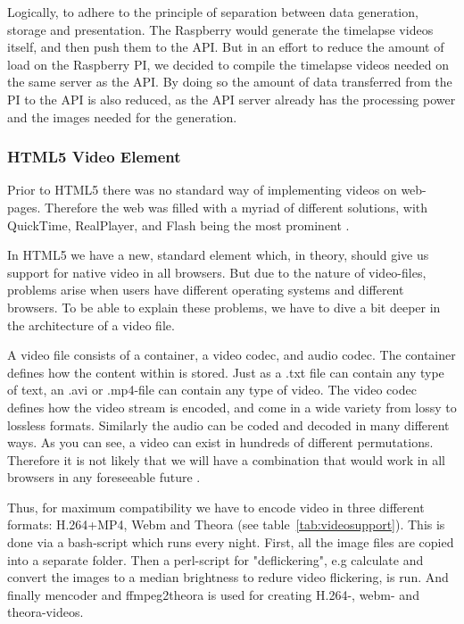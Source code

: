 Logically, to adhere to the principle of separation between data generation, storage and presentation. The Raspberry would generate the timelapse videos itself, and then push them to the API. But in an effort to reduce the amount of load on the Raspberry PI, we decided to compile the timelapse videos needed on the same server as the API. By doing so the amount of data transferred from the PI to the API is also reduced, as the API server already has the processing power and the images needed for the generation. 

\subsubsection{HTML5 Video Element}
Prior to HTML5 there was no standard way of implementing videos on web-pages. Therefore the web was filled with a myriad of different solutions, with QuickTime, RealPlayer, and Flash being the most prominent \citep{pilgrim2010html5}.

In HTML5 we have a new, standard \verb@video@ element which, in theory, should give us support for native video in all browsers. But due to the nature of video-files, problems arise when users have different operating systems and different browsers. To be able to explain these problems, we have to dive a bit deeper in the architecture of a video file.

A video file consists of a container, a video codec, and audio codec. The container defines how the content within is stored. Just as a .txt file can contain any type of text, an .avi or .mp4-file can contain any type of video. The video codec defines how the video stream is encoded, and come in a wide variety from lossy to lossless formats. Similarly the audio can be coded and decoded in many different ways. As you can see, a video can exist in hundreds of different permutations. Therefore it is not likely that we will have a combination that would work in all browsers in any foreseeable future \citep{pilgrim2010html5}.

Thus, for maximum compatibility we have to encode video in three different formats: H.264+MP4, Webm and Theora (see table~\ref{tab:videosupport}). This is done via a bash-script which runs every night. First, all the image files are copied into a separate folder. Then a perl-script for "deflickering", e.g calculate and convert the images to a median brightness to redure video flickering, is run. And finally mencoder and ffmpeg2theora is used for creating H.264-, webm- and theora-videos.  

